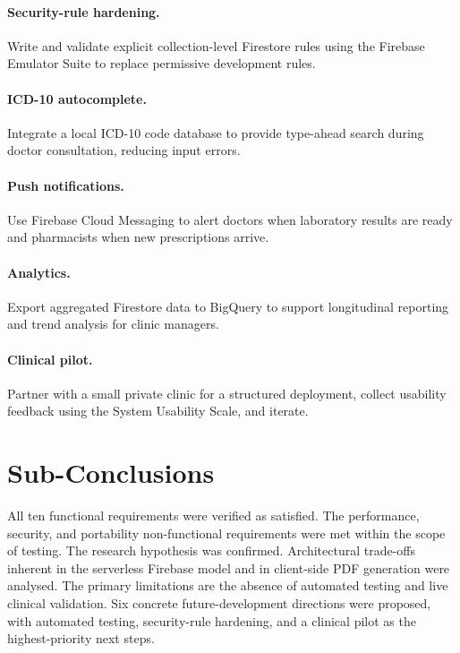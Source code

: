 \documentclass[12pt,a4paper,oneside]{report}
\begin{document}
\paragraph{Security-rule hardening.} Write and validate explicit
collection-level Firestore rules using the Firebase Emulator Suite to replace
permissive development rules.

\paragraph{ICD-10 autocomplete.} Integrate a local ICD-10 code database to
provide type-ahead search during doctor consultation, reducing input errors.

\paragraph{Push notifications.} Use Firebase Cloud Messaging to alert doctors
when laboratory results are ready and pharmacists when new prescriptions arrive.

\paragraph{Analytics.} Export aggregated Firestore data to BigQuery to support
longitudinal reporting and trend analysis for clinic managers.

\paragraph{Clinical pilot.} Partner with a small private clinic for a structured
deployment, collect usability feedback using the System Usability Scale, and
iterate.

\section{Sub-Conclusions}

All ten functional requirements were verified as satisfied. The performance,
security, and portability non-functional requirements were met within the scope
of testing. The research hypothesis was confirmed. Architectural trade-offs
inherent in the serverless Firebase model and in client-side PDF generation were
analysed. The primary limitations are the absence of automated testing and live
clinical validation. Six concrete future-development directions were proposed,
with automated testing, security-rule hardening, and a clinical pilot as the
highest-priority next steps.
\end{document}
